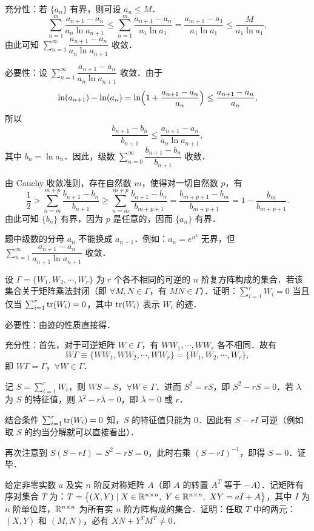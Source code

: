 \begin{solution}
充分性：若 $\{a_n\}$ 有界，则可设 $a_n\le M$．
\[
  \sum_{n=1}^{m}\frac{a_{n+1}-a_n}{a_n\ln a_{n+1}}
  \le\sum_{n=1}^{m}\frac{a_{n+1}-a_n}{a_1\ln a_1}
  =\frac{a_{m+1}-a_1}{a_1\ln a_1}
  \le\frac{M}{a_1\ln a_1},
\]
由此可知 $\sum_{n=1}^{\infty}\dfrac{a_{n+1}-a_n}{a_n\ln a_{n+1}}$ 收敛．

必要性：设 $\sum_{n=1}^{\infty}\dfrac{a_{n+1}-a_n}{a_n\ln a_{n+1}}$ 收敛．由于
\[
  \ln(a_{n+1})-\ln(a_n)=\ln\Bigl(1+\frac{a_{n+1}-a_n}{a_n}\Bigr)\le\frac{a_{n+1}-a_n}{a_n},
\]
所以
\[
  \frac{b_{n+1}-b_n}{b_{n+1}}\le\frac{a_{n+1}-a_n}{a_n\ln a_{n+1}},
\]
其中 $b_n=\ln a_n$．因此，级数 $\sum_{n=0}^{\infty}\dfrac{b_{n+1}-b_n}{b_{n+1}}$ 收敛．

由 Cauchy 收敛准则，存在自然数 $m$，使得对一切自然数 $p$，有
\[
  \frac12>\sum_{n=m}^{m+p}\frac{b_{n+1}-b_n}{b_{n+1}}
  \ge\sum_{n=m}^{m+p}\frac{b_{n+1}-b_n}{b_{m+p+1}}
  =\frac{b_{m+p+1}-b_m}{b_{m+p+1}}
  =1-\frac{b_m}{b_{m+p+1}} .
\]
由此可知 $\{b_n\}$ 有界，因为 $p$ 是任意的，因而 $\{a_n\}$ 有界．

题中级数的分母 $a_n$ 不能换成 $a_{n+1}$．例如：$a_n=e^{n^2}$ 无界，但 $\sum_{n=1}^{\infty}\dfrac{a_{n+1}-a_n}{a_{n+1}\ln a_{n+1}}$ 收敛．
\end{solution}

设 $\Gamma=\{W_1,W_2,\cdots,W_r\}$ 为 $r$ 个各不相同的可逆的 $n$ 阶复方阵构成的集合．若该集合关于矩阵乘法封闭（即 $\forall M,N\in\Gamma$，有 $MN\in\Gamma$）．证明：$\sum_{i=1}^{r}W_i=0$ 当且仅当 $\sum_{i=1}^{r}\operatorname{tr}(W_i)=0$，其中 $\operatorname{tr}(W_i)$ 表示 $W_i$ 的迹．

\begin{solution}
必要性：由迹的性质直接得．

充分性：首先，对于可逆矩阵 $W\in\Gamma$，有 $WW_1,\cdots,WW_r$ 各不相同．故有
\[
  W\Gamma\equiv\{WW_1,WW_2,\cdots,WW_r\}=\{W_1,W_2,\cdots,W_r\},
\]
即 $W\Gamma=\Gamma$，$\forall W\in\Gamma$．

记 $S=\sum_{i=1}^{r}W_i$，则 $WS=S$，$\forall W\in\Gamma$．进而 $S^2=rS$，即 $S^2-rS=0$．若 $\lambda$ 为 $S$ 的特征值，则 $\lambda^2-r\lambda=0$，即 $\lambda=0$ 或 $r$．

结合条件 $\sum_{i=1}^{r}\operatorname{tr}(W_i)=0$ 知，$S$ 的特征值只能为 $0$．因此有 $S-rI$ 可逆（例如取 $S$ 的约当分解就可以直接看出）．

再次注意到 $S(S-rI)=S^2-rS=0$，此时右乘 $(S-rI)^{-1}$，即得 $S=0$．证毕．
\end{solution}

给定非零实数 $a$ 及实 $n$ 阶反对称矩阵 $A$（即 $A$ 的转置 $A^T$ 等于 $-A$）．记矩阵有序对集合 $T$ 为：$T=\bigl\{(X,Y)\mid X\in\R^{n\times n},\ Y\in\R^{n\times n},\ XY=aI+A\bigr\}$，其中 $I$ 为 $n$ 阶单位阵，$\mathbb{R}^{n\times n}$ 为所有实 $n$ 阶方阵构成的集合．证明：任取 $T$ 中的两元：$(X,Y)$ 和 $(M,N)$，必有 $XN+Y^TM^T\ne 0$．

